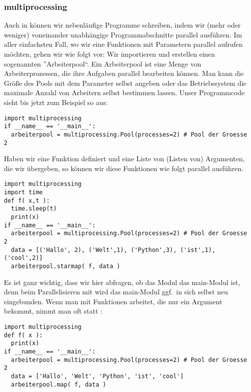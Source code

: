 \subsubsection{multiprocessing}
\label{section:module:empfohlene_module:multiprocessing}
Auch in \Python können wir nebenläufige Programme schreiben, indem wir (mehr oder weniger) voneinander unabhängige Programmabschnitte parallel ausführen.
Im aller einfachsten Fall, wo wir eine Funktionen  mit Parametern  parallel aufrufen möchten, gehen wir wie folgt vor:
Wir importieren  und erstellen einen sogenannten ''Arbeiterpool``.
Ein Arbeiterpool ist eine Menge von Arbeiterprozessen, die ihre Aufgaben parallel bearbeiten können.
Man kann die Größe des Pools mit dem Parameter  selbst angeben oder das Betriebssystem die maximale Anzahl von Arbeitern selbst bestimmen lassen.
Unser Programmcode sieht bis jetzt zum Beispiel so aus:
\begin{lstlisting}
import multiprocessing
if __name__ == '__main__':
  arbeiterpool = multiprocessing.Pool(processes=2) # Pool der Groesse 2
\end{lstlisting}
Haben wir eine Funktion  definiert und eine Liste  von (Listen von) Argumenten, die wir  übergeben,
so können wir diese Funktionen wie folgt parallel ausführen.
\begin{lstlisting}
import multiprocessing
import time
def f( x,t ):
  time.sleep(t)
  print(x)
if __name__ == '__main__':
  arbeiterpool = multiprocessing.Pool(processes=2) # Pool der Groesse 2
  data = [('Hallo', 2), ('Welt',1), ('Python',3), ('ist',1), ('cool',2)]
  arbeiterpool.starmap( f, data )
\end{lstlisting}
Es ist ganz wichtig, dass wir hier abfragen, ob das Modul das main-Modul ist,
denn beim Parallelisieren mit  wird das main-Modul ggf.\ in sich selbst neu eingebunden.
Wenn man mit Funktionen arbeitet, die nur ein Argument bekommt, nimmt man oft  statt :
\begin{lstlisting}
import multiprocessing
def f( x ):
  print(x)
if __name__ == '__main__':
  arbeiterpool = multiprocessing.Pool(processes=2) # Pool der Groesse 2
  data = ['Hallo', 'Welt', 'Python', 'ist', 'cool']
  arbeiterpool.map( f, data )
\end{lstlisting}


